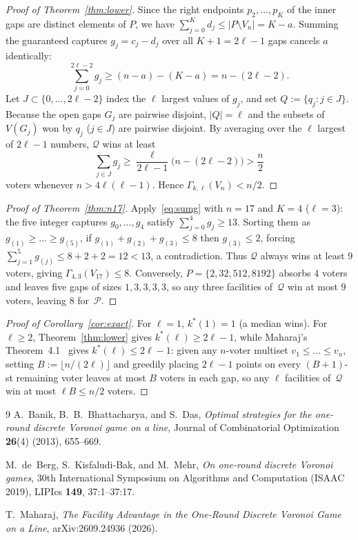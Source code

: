 \documentclass[11pt]{article}
\begin{document}
\begin{proof}[Proof of Theorem~\ref{thm:lower}]
Since the right endpoints $p_2, \dots, p_K$ of the inner gaps are distinct elements of $P$, we have $\sum_{j=0}^K d_j \le |P \setminus V_n| = K - a$. Summing the guaranteed captures $g_j = c_j - d_j$ over all $K + 1 = 2\ell - 1$ gaps cancels $a$ identically:
\begin{equation}\label{eq:sumg}
\sum_{j=0}^{2\ell - 2} g_j \ge (n - a) - (K - a) = n - (2\ell - 2).
\end{equation}
Let $J \subset \{0, \dots, 2\ell - 2\}$ index the $\ell$ largest values of $g_j$, and set $Q := \{q_j : j \in J\}$. Because the open gaps $G_j$ are pairwise disjoint, $|Q| = \ell$ and the subsets of $V(G_j)$ won by $q_j$ ($j \in J$) are pairwise disjoint. By averaging over the $\ell$ largest of $2\ell - 1$ numbers, $\mathcal{Q}$ wins at least
\[
\sum_{j \in J} g_j \ge \frac{\ell}{2\ell - 1}\bigl(n - (2\ell - 2)\bigr) > \frac{n}{2}
\]
voters whenever $n > 4\ell(\ell - 1)$. Hence $\Gamma_{k,\ell}(V_n) < n/2$.
\end{proof}

\begin{proof}[Proof of Theorem~\ref{thm:n17}]
Apply~\eqref{eq:sumg} with $n = 17$ and $K = 4$ ($\ell = 3$): the five integer captures $g_0, \dots, g_4$ satisfy $\sum_{j=0}^4 g_j \ge 13$. Sorting them as $g_{(1)} \ge \dots \ge g_{(5)}$, if $g_{(1)} + g_{(2)} + g_{(3)} \le 8$ then $g_{(3)} \le 2$, forcing $\sum_{j=1}^5 g_{(j)} \le 8 + 2 + 2 = 12 < 13$, a contradiction. Thus $\mathcal{Q}$ always wins at least $9$ voters, giving $\Gamma_{4,3}(V_{17}) \le 8$. Conversely, $P = \{2, 32, 512, 8192\}$ absorbs $4$ voters and leaves five gaps of sizes $1, 3, 3, 3, 3$, so any three facilities of~$\mathcal{Q}$ win at most $9$ voters, leaving $8$ for~$\mathcal{P}$.
\end{proof}

\begin{proof}[Proof of Corollary~\ref{cor:exact}]
For $\ell = 1$, $k^*(1) = 1$ (a median wins). For $\ell \ge 2$, Theorem~\ref{thm:lower} gives $k^*(\ell) \ge 2\ell - 1$, while Maharaj's Theorem~4.1~\cite{Maharaj2026} gives $k^*(\ell) \le 2\ell - 1$: given any $n$-voter multiset $v_1 \le \dots \le v_n$, setting $B := \lfloor n/(2\ell) \rfloor$ and greedily placing $2\ell - 1$ points on every $(B+1)$-st remaining voter leaves at most $B$ voters in each gap, so any $\ell$ facilities of~$\mathcal{Q}$ win at most $\ell B \le n/2$ voters.
\end{proof}

\begin{thebibliography}{9}
A.~Banik, B.~B.~Bhattacharya, and S.~Das,
\emph{Optimal strategies for the one-round discrete Voronoi game on a line},
Journal of Combinatorial Optimization \textbf{26}(4) (2013), 655--669.

M.~de~Berg, S.~Kisfaludi-Bak, and M.~Mehr,
\emph{On one-round discrete Voronoi games},
30th International Symposium on Algorithms and Computation (ISAAC 2019), LIPIcs \textbf{149}, 37:1--37:17.

T.~Maharaj,
\emph{The Facility Advantage in the One-Round Discrete Voronoi Game on a Line},
arXiv:2609.24936 (2026).
\end{thebibliography}
\end{document}

